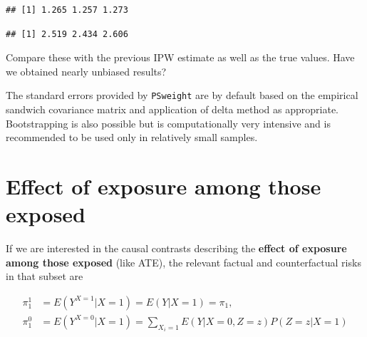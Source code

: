 \documentclass[
]{book}
\newenvironment{Shaded}{\begin{snugshade}}{\end{snugshade}}
\newcommand{\AttributeTok}[1]{\textcolor[rgb]{0.13,0.29,0.53}{#1}}
\newcommand{\DecValTok}[1]{\textcolor[rgb]{0.00,0.00,0.81}{#1}}
\newcommand{\FunctionTok}[1]{\textcolor[rgb]{0.13,0.29,0.53}{\textbf{#1}}}
\newcommand{\NormalTok}[1]{#1}
\newcommand{\SpecialCharTok}[1]{\textcolor[rgb]{0.81,0.36,0.00}{\textbf{#1}}}
\newcommand{\StringTok}[1]{\textcolor[rgb]{0.31,0.60,0.02}{#1}}
\begin{document}
\begin{Shaded}
\end{Shaded}

\begin{verbatim}
## [1] 1.265 1.257 1.273
\end{verbatim}

\begin{Shaded}
\end{Shaded}

\begin{verbatim}
## [1] 2.519 2.434 2.606
\end{verbatim}

Compare these with the previous IPW estimate as
well as the true values. Have we obtained nearly unbiased results?

The standard errors provided by \texttt{PSweight}
are by default based on the
empirical sandwich covariance matrix and application
of delta method as
appropriate. Bootstrapping is also possible but is
computationally very
intensive and is recommended to be used only in relatively small
samples.

\section{Effect of exposure among those exposed}\label{effect-of-exposure-among-those-exposed}

If we are interested in the
causal contrasts describing the \textbf{effect
of exposure among those exposed} (like ATE),
the relevant factual and
counterfactual risks in that subset are

\[
\begin{aligned}
 \pi^1_1 & = E(Y^{X=1}|X=1) = E(Y|X=1) = \pi_1, \\
 \pi^0_1 & = E(Y^{X=0}|X=1) = \sum_{X_i=1} E(Y|X=0, Z=z)P(Z=z|X=1)
\end{aligned}
\]
\end{document}

